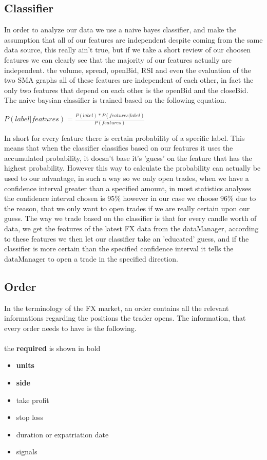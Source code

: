 \subsection{Classifier}
In order to analyze our data we use a naive bayes classifier, and make the assumption that all of our features are independent despite coming from the same data source, this really ain't true, but if we take a short review of our choosen features we can clearly see that the majority of our features actually are independent. the volume, spread, openBid, RSI and even the evaluation of the two SMA graphs all of these features are independent of each other, in fact the only two features that depend on each other is the openBid and the closeBid. The naive baysian classifier is trained based on the following equation.
\\
\begin{center}
$ P(label|features) = \frac{P(label)*P(features|label)}{P(features)}$
\end{center}

In short for every feature there is certain probability of a specific label. This means that when the classifier classifies based on our features it uses the accumulated probability, it doesn't base it's 'guess' on the feature that has the highest probability.
However this way to calculate the probability can actually be used to our advantage, in such a way so we only open trades, when we have a confidence interval greater than a specified amount, in most statistics analyses the confidence interval chosen is 95\% however in our case we choose 96\% due to the reason, that we only want to open trades if we are really certain upon our guess.
The way we trade based on the classifier is that for every candle worth of data, we get the features of the latest FX data from the dataManager, according to these features we then let our classifier take an 'educated' guess, and if the classifier is more certain than the specified confidence interval it tells the dataManager to open a trade in the specified direction.


\subsection{Order}
In the terminology of the FX market, an order contains all the relevant informations regarding the positions the trader opens. The information, that every order needs to have is the following.
\\
\\
the \textbf{required} is shown in bold
\begin{itemize}
\item{\textbf{units}}
\item{\textbf{side}}
\item{take profit}
\item{stop loss}
\item{duration or expatriation date}
\item{signals}
\end{itemize}

